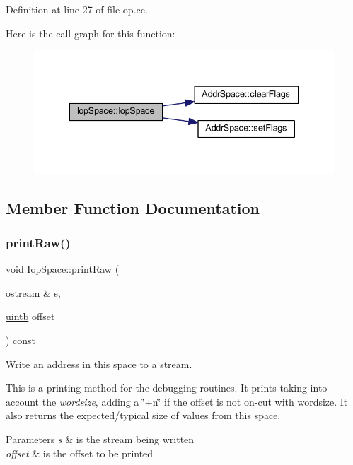 Definition at line 27 of file op.\+cc.

Here is the call graph for this function\+:
\nopagebreak
\begin{figure}[H]
\begin{center}
\leavevmode
\includegraphics[width=336pt]{class_iop_space_aeacf0e01de647ce00ae448ce89eba45a_cgraph}
\end{center}
\end{figure}


\subsection{Member Function Documentation}
\mbox{\label{class_iop_space_aa5e2fc99ee39d375ef563cd3fea2101d}} 
\subsubsection{\texorpdfstring{printRaw()}{printRaw()}}
{\footnotesize\ttfamily void Iop\+Space\+::print\+Raw (\begin{DoxyParamCaption}\item[{ostream \&}]{s,  }\item[{\mbox{\hyperlink{types_8h_a2db313c5d32a12b01d26ac9b3bca178f}{uintb}}}]{offset }\end{DoxyParamCaption}) const\hspace{0.3cm}{\ttfamily [virtual]}}



Write an address in this space to a stream. 

This is a printing method for the debugging routines. It prints taking into account the {\itshape wordsize}, adding a \char`\"{}+n\char`\"{} if the offset is not on-\/cut with wordsize. It also returns the expected/typical size of values from this space. 
\begin{DoxyParams}{Parameters}
{\em s} & is the stream being written \\
\hline
{\em offset} & is the offset to be printed \\
\hline
\end{DoxyParams}


